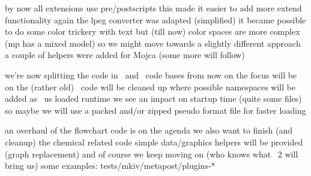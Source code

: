 
\StartSteps
\startitemize
\startitem by now all extensions use pre/postscripts \stopitem \FlushStep
\startitem this made it easier to add more extend functionality \stopitem \FlushStep
\startitem again the lpeg converter was adapted (simplified) \stopitem \FlushStep
\startitem it became possible to do some color trickery with text \stopitem \FlushStep
\startitem but (till now) color spaces are more complex (mp has a mixed model) \stopitem \FlushStep
\startitem so we might move towards a slightly different approach \stopitem \FlushStep
\startitem a couple of helpers were added for Mojca (some more will follow) \stopitem \FlushStep
\stopitemize
\StopSteps


\StartSteps
\startitemize
\startitem we're now splitting the code in \MPII\ and \MPIV\ code bases \stopitem \FlushStep
\startitem from now on the focus will be on \MPIV \stopitem \FlushStep
\startitem the (rather old) \METAFUN\ code will be cleaned up \stopitem \FlushStep
\startitem where possible namespaces will be added \stopitem \FlushStep
\startitem as \METAFUN\ us loaded runtime we see an impact on startup time (quite some files) \stopitem \FlushStep
\startitem so maybe we will use a packed and/or zipped pseudo format file for faster loading \stopitem \FlushStep
\stopitemize
\StopSteps


\StartSteps
\startitemize
\startitem an overhaul of the flowchart code is on the agenda \stopitem \FlushStep
\startitem we also want to finish (and cleanup) the chemical related code \stopitem \FlushStep
\startitem simple data/graphics helpers will be provided (graph replacement) \stopitem \FlushStep
\startitem and of course we keep moving on (who knows what \METAPOST\ 2 will bring us) \stopitem \FlushStep
\startitem some examples: tests/mkiv/metapost/plugins-* \stopitem \FlushStep
\stopitemize
\StopSteps

\stopdocument
